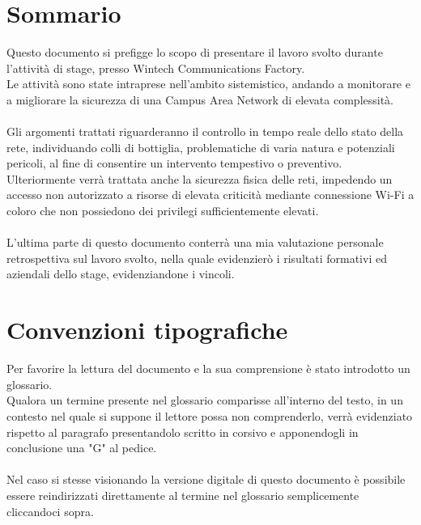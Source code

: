 \documentclass[Tesi.tex]{subfiles}
\begin{document}
\clearpage\thispagestyle{empty}
	
\renewcommand{\chaptername}{}
\renewcommand{\thechapter}{}
\chapter{Sommario}
Questo documento si prefigge lo scopo di presentare il lavoro svolto durante l'attività di stage, presso Wintech Communications Factory. \\
Le attività sono state intraprese nell'ambito sistemistico, andando a monitorare e a migliorare la sicurezza di una Campus Area Network di elevata complessità. \\\\

Gli argomenti trattati riguarderanno il controllo in tempo reale dello stato della rete, individuando colli di bottiglia, problematiche di varia natura e potenziali pericoli, al fine di consentire un intervento tempestivo o preventivo.\\
Ulteriormente verrà trattata anche la sicurezza fisica delle reti, impedendo un accesso non autorizzato a risorse di elevata criticità mediante connessione Wi-Fi a coloro che non possiedono dei privilegi sufficientemente elevati. \\\\

L'ultima parte di questo documento conterrà una mia valutazione personale retrospettiva sul lavoro svolto, nella quale evidenzierò i risultati formativi ed aziendali dello stage, evidenziandone i vincoli. \\

\newpage
\chapter{Convenzioni tipografiche}
Per favorire la lettura del documento e la sua comprensione è stato introdotto un glossario. \\
Qualora un termine presente nel glossario comparisse all'interno del testo, in un contesto nel quale si suppone il lettore possa non comprenderlo, verrà evidenziato rispetto al paragrafo presentandolo scritto in corsivo e apponendogli in conclusione una "G" al pedice. \\\\
Nel caso si stesse visionando la versione digitale di questo documento è possibile essere reindirizzati direttamente al termine nel glossario semplicemente cliccandoci sopra. \\


\clearpage
\end{document}

